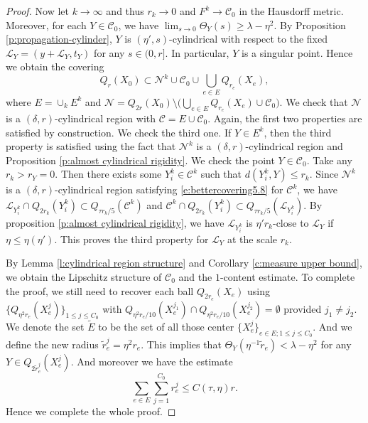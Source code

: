 \documentclass[10pt,a4paper]{amsart}
\newcommand{\cC}{\mathcal{C}}
\newcommand{\cL}{\mathcal{L}}
\newcommand{\cN}{\mathcal{N}}
\begin{document}
\begin{proof}
Now let $k \to \infty$ and thus $r_k \to 0$ and $F^k \to \cC_0$ in the Hausdorff metric. Moreover, for each $Y \in \cC_0$, we have $\lim_{s\to 0} \Theta_Y(s) \ge \lambda- \eta^2$. By Proposition \ref{p:propagation-cylinder}, $Y$ is $(\eta',s)$-cylindrical with respect to the fixed $\cL_Y = (y + \cL_Y, t_Y)$ for any $s\in(0, r]$. In particular, $Y$ is a singular point.  Hence we obtain the covering
\begin{equation*}
    Q_r(X_0) \subset \cN^k \cup \cC_0 \cup \bigcup_{e\in E}Q_{r_e}(X_e),
\end{equation*}
where $E = \cup_k E^k$ and $\cN = Q_{2r}(X_0) \setminus \big( \bigcup_{e\in E}Q_{r_e}(X_e) \cup \cC_0)$. We check that $\cN$ is a $(\delta,r)$-cylindrical region with $\cC = E \cup \cC_0$. Again, the first two properties are satisfied by construction. We check the third one. If $Y\in E^k$, then the third property is satisfied using the fact that $\cN^k$ is a $(\delta,r)$-cylindrical region and Proposition \ref{p:almost cylindrical rigidity}. We check the point $Y \in \cC_0$. Take any $r_k>r_Y=0$. Then there exists some $Y^k_i \in \cC^k$ such that $d(Y^k_i,Y) \le r_k$. Since $\cN^k$ is a $(\delta,r)$-cylindrical region satisfying \eqref{e:bettercovering5.8} for $\cC^k$, we have $\cL_{Y^k_i}\cap Q_{2r_k}(Y^k_i) \subset Q_{\tau r_k/5}(\cC^k)$ and $\cC^k \cap Q_{2r_k}(Y^k_i) \subset Q_{\tau r_k/5}(\cL_{Y^k_i})$. By proposition \ref{p:almost cylindrical rigidity}, we have $\cL_{Y^k_i}$ is $\eta'r_k$-close to $\cL_Y$ if $\eta\le\eta(\eta')$. This proves the third property for $\cL_{Y}$ at the scale $r_k$.

By  Lemma \ref{l:cylindrical region structure} and Corollary \ref{c:measure upper bound}, we obtain the Lipschitz structure of $\cC_0$ and the $1$-content estimate. To complete the proof, we still need to recover each ball $Q_{2r_e}(X_e)$ using $\{Q_{\eta^2 r_e}(X_e^j)\}_{1 \le j \le C_0}$ with $Q_{\eta^2 r_e/10}(X_e^{j_1}) \cap Q_{\eta^2 r_e /10}(X_e^{j_2}) = \emptyset$ provided $j_1 \neq j_2$. We denote the set $\tilde{E}$ to be the set of all those center $\{X_e^j\}_{e\in E; 1\le j \le C_0}$. And we define the new radius $\tilde{r}_e^j = \eta^2 r_e$. This implies that $\Theta_Y(\eta^{-1} \tilde{r}_e) < \lambda - \eta^2$ for any $Y \in Q_{2 \tilde{r}^j_e}(X^j_e)$. And moreover we have the estimate
\begin{equation*}
    \sum_{e\in E} \sum_{j=1}^{C_0}  r_e^j \le C(\tau,\eta)r.
\end{equation*}
Hence we complete the whole proof.
\end{proof}
\end{document}
